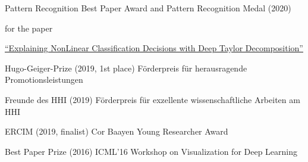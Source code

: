 \documentclass[10pt,a4paper]{article} %
\begin{document}







\inlineheadsection
{Pattern Recognition Best Paper Award and Pattern Recognition Medal (2020)}
{
    for the paper

    \href{https://doi.org/10.1016/j.patcog.2016.11.008}{\qquad ``Explaining NonLinear Classification Decisions with Deep Taylor Decomposition''}
}

\inlineheadsection %
{Hugo-Geiger-Prize (2019, 1st place)}
{
    F\"orderpreis f\"ur herausragende Promotionsleistungen
}

\inlineheadsection %
{Freunde des HHI (2019)}
{
    F\"orderpreis f\"ur exzellente wissenschaftliche Arbeiten am HHI
}

\inlineheadsection %
{ERCIM (2019, finalist)}
{
    Cor Baayen Young Researcher Award
}

\inlineheadsection %
{Best Paper Prize (2016)}
{
    ICML'16 Workshop on Visualization for Deep Learning
}


\spacedhrule{1.6em}{-0.4em} %
\end{document}
